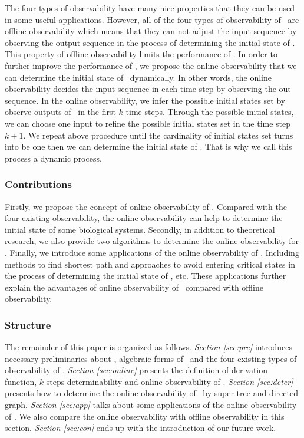 The four  types of observability  have many nice properties that they can be used in some useful applications. However, all of the four types of observability of \BCNs\ are offline observability which means that they can not adjust the input sequence by observing the output sequence in the process of determining the initial state of \BCNs. This property of offline observability limits the performance of \BCNs. In order to further improve the performance of \BCNs, we propose the online observability that we can determine the initial state of \BCNs\ dynamically. In other words,  the online observability decides the input sequence in each time step by observing the out sequence. In the  online observability, we infer the possible  initial states set by observe outputs of \BCN\ in the first $k$ time steps. Through the  possible  initial states, we can choose one input to refine the possible initial states set in the time step $k+1$. We repeat above procedure until the cardinality of initial states set turns into be one then we can determine the initial state of \BCNs. That is why we call this process a dynamic process. 

\subsubsection*{Contributions}
Firstly, we propose the concept of online observability of \BCNs. Compared with the four existing observability, the online observability can help to determine the initial state of some biological systems. Secondly, in addition to theoretical research, we also provide two algorithms to determine the online observability for \BCNs. Finally, we introduce some applications of the online observability of \BCNs. Including methods to find shortest path and approaches to avoid entering critical states in the process of determining the initial state of \BCNs, etc.  These applications further explain the advantages of online observability of \BCNs\ compared with offline observability. %
\subsubsection*{Structure}
The remainder of this paper is organized as follows. {\em Section \ref{sec:pre}} introduces necessary preliminaries about \BCNs, algebraic forms of \BCNs\ and the four existing types of observability of  \BCNs. {\em Section \ref{sec:online}} presents the definition of derivation function, $k$ steps determinability and online observability of \BCNs. {\em Section \ref{sec:deter}} presents how to determine the online observability of \BCNs\ by super tree and directed graph. {\em Section \ref{sec:app}} talks about some applications of the online observability of \BCNs. We also compare the online observability with offline observability in this section. {\em Section \ref{sec:con}} ends up  with the introduction of our future work.


